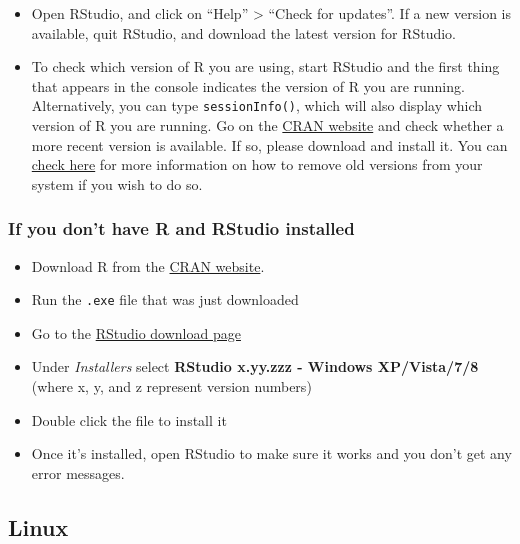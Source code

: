 \documentclass[]{book}
\providecommand{\tightlist}{%
  \setlength{\itemsep}{0pt}\setlength{\parskip}{0pt}}
\theoremstyle{definition}
\theoremstyle{definition}
\theoremstyle{remark}
\begin{document}
\begin{itemize}
\tightlist
\item
  Open RStudio, and click on ``Help'' \textgreater{} ``Check for
  updates''. If a new version is available, quit RStudio, and download
  the latest version for RStudio.
\item
  To check which version of R you are using, start RStudio and the first
  thing that appears in the console indicates the version of R you are
  running. Alternatively, you can type \texttt{sessionInfo()}, which
  will also display which version of R you are running. Go on the
  \href{https://cran.r-project.org/bin/windows/base/}{CRAN website} and
  check whether a more recent version is available. If so, please
  download and install it. You can
  \href{https://cran.r-project.org/bin/windows/base/rw-FAQ.html\#How-do-I-UNinstall-R_003f}{check
  here} for more information on how to remove old versions from your
  system if you wish to do so.
\end{itemize}

\subsubsection*{If you don't have R and RStudio
installed}\label{if-you-dont-have-r-and-rstudio-installed-1}

\begin{itemize}
\tightlist
\item
  Download R from the
  \href{http://cran.r-project.org/bin/windows/base/release.htm}{CRAN
  website}.
\item
  Run the \texttt{.exe} file that was just downloaded
\item
  Go to the
  \href{https://www.rstudio.com/products/rstudio/download/\#download}{RStudio
  download page}
\item
  Under \emph{Installers} select \textbf{RStudio x.yy.zzz - Windows
  XP/Vista/7/8} (where x, y, and z represent version numbers)
\item
  Double click the file to install it
\item
  Once it's installed, open RStudio to make sure it works and you don't
  get any error messages.
\end{itemize}

\subsection*{Linux}\label{linux}
\end{document}
